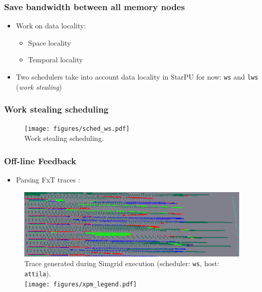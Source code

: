 \documentclass[10pt,a4paper]{beamer}
\begin{document}
\begin{frame}
\frametitle{Save bandwidth between all memory nodes}
  \begin{itemize}
    \vfill
  \item Work on data locality:
    \begin{itemize}
    \item Space locality
    \item Temporal locality
    \end{itemize}
    \vfill
  \item Two schedulers take into account data locality in StarPU for now: \texttt{ws} and \texttt{lws} (\textit{work stealing})
    \vfill
  \end{itemize}
\end{frame}

\begin{frame}
  \frametitle{Work stealing scheduling}
  \vfill
  \begin{figure}
    \center
    \texttt{[image: figures/sched\_ws.pdf]} \\
    \small{Work stealing scheduling.}
  \end{figure}
  \vfill
\end{frame}


\begin{frame}
\frametitle{Off-line Feedback}
\begin{itemize}
\item Parsing FxT traces :
\end{itemize}
\begin{figure}
  \center
  \includegraphics[width=1\linewidth]{figures/locality_attila_ws.png} \\
  \small{Trace generated during Simgrid execution (scheduler: \texttt{ws}, host:
    \texttt{attila}).} \\
  \vfill
  \texttt{[image: figures/xpm\_legend.pdf]}
  \end{figure}
\end{frame}
\end{document}
